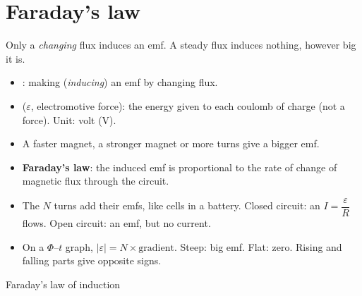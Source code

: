 \section{Faraday's law}\label{ch3:sec:faraday}

\begin{bigidea}
Only a \emph{changing} flux induces an emf. A steady flux induces nothing, however
big it is.
\end{bigidea}

\begin{itemize}
  \item {}: making (\emph{inducing}) an emf by changing flux.
  \item {} ($\varepsilon$, electromotive force): the energy given to each
        coulomb of charge (not a force). Unit: volt (V).
  \item A faster magnet, a stronger magnet or more turns give a bigger emf.
  \item \textbf{Faraday's law}: the induced emf is proportional to the rate of
        change of magnetic flux through the circuit.
  \item The $N$ turns add their emfs, like cells in a battery. Closed circuit: an
         $I = \dfrac{\varepsilon}{R}$ flows. Open circuit: an
        emf, but no current.
  \item On a $\Phi$--$t$ graph, $\lvert\varepsilon\rvert = N \times \text{gradient}$.
        Steep: big emf. Flat: zero. Rising and falling parts give opposite signs.
\end{itemize}

\begin{formulacard}{Faraday's law of induction}
  \begin{symbols}
  \end{symbols}
\end{formulacard}


